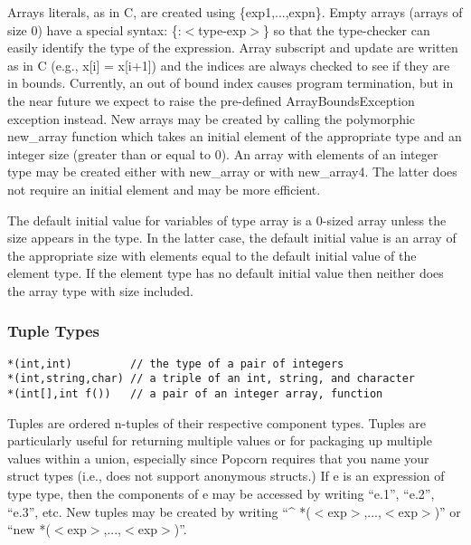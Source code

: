 \documentclass[titlepage,10pt]{article}
\begin{document}
Arrays literals, as in C, are created using \{exp1,...,expn\}.  Empty
arrays (arrays of size 0) have a special syntax:  \{:$<$type-exp$>$\} so
that the type-checker can easily identify the type of the expression.
Array subscript and update are written as in C (e.g., x[i] = x[i+1]) and
the indices are always checked to see if they are in bounds.  Currently,
an out of bound index causes program termination, but in the near future
we expect to raise the pre-defined ArrayBoundsException exception
instead.  New arrays may be created by calling the polymorphic
new{\_}array function which takes an initial element of the appropriate
type and an integer size (greater than or equal to 0).  An array with
elements of an integer type may be created either with new{\_}array or
with new{\_}array4.  The latter does not require an initial element and
may be more efficient.

The default initial value for variables of type array is a 0-sized array
unless the size appears in the type.  In the latter case, the default
initial value is an array of the appropriate size with elements equal to
the default initial value of the element type.  If the element type has
no default initial value then neither does the array type with size
included.

\subsubsection{Tuple Types}


\begin{verbatim}
*(int,int)         // the type of a pair of integers
*(int,string,char) // a triple of an int, string, and character
*(int[],int f())   // a pair of an integer array, function
\end{verbatim}

Tuples are ordered n-tuples of their respective component types.  Tuples
are particularly useful for returning multiple values or for packaging
up multiple values within a union, especially since Popcorn requires
that you name your struct types (i.e., does not support anonymous
structs.)   If e is an expression of type type, then the components of e
may be accessed by writing ``e.1'', ``e.2'', ``e.3'', etc.  New tuples
may be created by writing ``\^{} *($<$exp$>$,...,$<$exp$>$)'' or ``new
*($<$exp$>$,...,$<$exp$>$)''.
\end{document}
